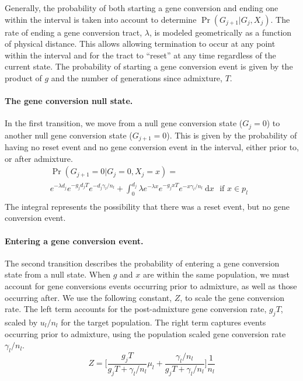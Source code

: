 Generally, the probability of both starting a gene conversion and ending one within the interval is taken into account to determine $\Pr(G_{j+1}|G_j,X_j)$.
The rate of ending a gene conversion tract, $\lambda$, is modeled geometrically as a function of physical distance.
This allows allowing termination to occur at any point within the interval and for the tract to ``reset'' at any time regardless of the current state. %
The probability of starting a gene conversion event is given by the product of $g$ and the number of generations since admixture, $T$.



\paragraph{The gene conversion null state.}
In the first transition, we move from a null gene conversion state ($G_j=0$) to another null gene conversion state ($G_{j+1}=0$).
This is given by the probability of having no reset event and no gene conversion event in the interval, either prior to, or after admixture.
%
\begin{equation} \label{eq:Gnull}
    \begin{split}
        \Pr(G_{j+1}=0|G_{j}=0,X_j=x) = \\
        e^{-\lambda d_j} e^{-g_j d_j T } e^{-d_j \gamma_l/n_l} +
    \int_0^{d_j} \lambda e^{-\lambda x} e^{-g_j x T } e^{-x \gamma_l/n_l } ~\mathrm{d}x ~~~
     \text{if $x \in p_l $ } \\%
\end{split}
\end{equation}
%
The integral represents the possibility that there was a reset event, but no gene conversion event.

\paragraph{Entering a gene conversion event.}
The second transition describes the probability of entering a gene conversion state from a null state.
When $g$ and $x$ are within the same population, we must account for gene conversions events occurring prior to admixture, as well as those occurring after.
We use the following constant, $Z$, to scale the gene conversion rate.
The left term accounts for the post-admixture gene conversion rate, $g_j T$, scaled by $u_l/n_l$ for the target population.
The right term captures events occurring prior to admixture, using the population scaled gene conversion rate $\gamma_l/n_l$.
\newcommand{\constZ}{\bigg[ \frac{g_j T}{g_j T + \gamma_l/n_l} \mu_l + \frac{\gamma_l/n_l}{g_j T + \gamma_l/n_l}  \bigg] \frac{1}{n_l} }
\begin{equation} \label{eq:constZ}
    Z = \constZ
\end{equation}

